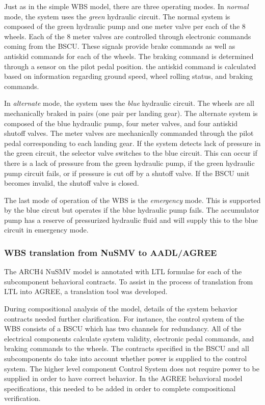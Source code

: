 Just as in the simple WBS model, there are three operating modes. In \textit{normal} mode, the system uses the \textit{green} hydraulic circuit. The normal system is composed of the green hydraulic pump and one meter valve per each of the 8 wheels. Each of the 8 meter valves are controlled through electronic commands coming from the BSCU. These signals provide brake commands as well as antiskid commands for each of the wheels. The braking command is determined through a sensor on the pilot pedal position. the antiskid command is calculated based on information regarding ground speed, wheel rolling status, and braking commands. 

In \textit{alternate} mode, the system uses the \textit{blue} hydraulic circuit.  The wheels are all mechanically braked in pairs (one pair per landing gear). The alternate system is composed of the blue hydraulic pump, four meter valves, and four antiskid shutoff valves. The meter valves are mechanically commanded through the pilot pedal corresponding to each landing gear. If the system detects lack of pressure in the green circuit, the selector valve switches to the blue circuit. This can occur if there is a lack of pressure from the green hydraulic pump, if the green hydraulic pump circuit fails, or if pressure is cut off by a shutoff valve. If the BSCU unit becomes invalid, the shutoff valve is closed. 

The last mode of operation of the WBS is the \textit{emergency} mode. This is supported by the blue circut but operates if the blue hydraulic pump fails. The accumulator pump has a reserve of pressurized hydraulic fluid and will supply this to the blue circuit in emergency mode. 

\subsubsection{WBS translation from NuSMV to AADL/AGREE}
The ARCH4 NuSMV model is annotated with LTL formulae for each of the subcomponent behavioral contracts. To assist in the process of translation from LTL into AGREE, a translation tool was developed. 

During compositional analysis of the model, details of the system behavior contracts needed further clarification. For instance, the control system of the WBS consists of a BSCU which has two channels for redundancy. All of the electrical components calculate system validity, electronic pedal commands, and braking commands to the wheels. The contracts specified in the BSCU and all subcomponents do take into account whether power is supplied to the control system. The higher level component Control System does not require power to be supplied in order to have correct behavior. In the AGREE behavioral model specifications, this needed to be added in order to complete compositional verification. 

